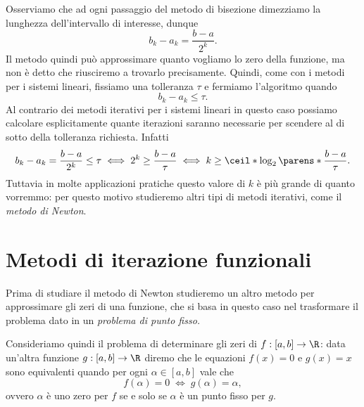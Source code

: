 
Osserviamo che ad ogni passaggio del metodo di bisezione dimezziamo la lunghezza dell'intervallo di interesse, dunque \[
    b_k - a_k = \frac{b - a}{2^k}.
\] Il metodo quindi può approssimare quanto vogliamo lo zero della funzione, ma non è detto che riusciremo a trovarlo precisamente. Quindi, come con i metodi per i sistemi lineari, fissiamo una tolleranza $\tau$ e fermiamo l'algoritmo quando \[
    b_k - a_k \leq \tau.
\] Al contrario dei metodi iterativi per i sistemi lineari in questo caso possiamo calcolare esplicitamente quante iterazioni saranno necessarie per scendere al di sotto della tolleranza richiesta. Infatti \[
    b_k - a_k = \frac{b - a}{2^k} \leq \tau 
    \iff 2^k \geq \frac{b - a}{\tau} 
    \iff k \geq \ceil*{\log_2\parens*{\frac{b-a}{\tau}}}. 
\] Tuttavia in molte applicazioni pratiche questo valore di $k$ è più grande di quanto vorremmo: per questo motivo studieremo altri tipi di metodi iterativi, come il \emph{metodo di Newton}.

\section{Metodi di iterazione funzionali}

Prima di studiare il metodo di Newton studieremo un altro metodo per approssimare gli zeri di una funzione, che si basa in questo caso nel trasformare il problema dato in un \emph{problema di punto fisso.}

Consideriamo quindi il problema di determinare gli zeri di $f : [a, b] \to \R$: data un'altra funzione $g : [a, b] \to \R$ diremo che le equazioni $f(x) = 0$ e $g(x) = x$ sono equivalenti quando per ogni $\alpha \in [a, b]$ vale che \[
    f(\alpha) = 0 \;\iff\; g(\alpha) = \alpha,
\] ovvero $\alpha$ è uno zero per $f$ se e solo se $\alpha$ è un punto fisso per $g$.

